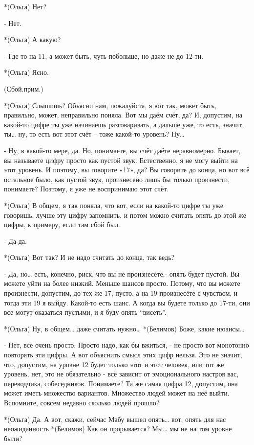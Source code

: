 *(Ольга) Нет?

- Нет.

*(Ольга) А какую?

- Где-то на 11, а может быть, чуть побольше, но даже не до 12-ти.

*(Ольга) Ясно.

(Сбой.прим.)

*(Ольга) Слышишь? Объясни нам, пожалуйста, я вот так, может быть, правильно, может, неправильно поняла. Вот мы даём счёт, да? И, допустим, на какой-то цифре ты уже начинаешь разговаривать, а дальше уже, то есть, значит, ты… ну, то есть вот этот счёт – тоже какой-то уровень? Ну…

- Ну, в какой-то мере, да. Но, понимаете, вы счёт даёте неравномерно. Бывает, вы называете цифру просто как пустой звук. Естественно, я не могу выйти на этот уровень. И поэтому, вы говорите «17», да? Вы говорите до конца, но вот всё остальное было, как пустой звук, произнесено лишь бы только произнести, понимаете? Поэтому, я уже не воспринимаю этот счёт.

*(Ольга) В общем, я так поняла, что вот, если на какой-то цифре ты уже говоришь, лучше эту цифру запомнить, и потом можно считать опять до этой же цифры, к примеру, если там сбой был.

- Да-да.

*(Ольга) Вот так? И не надо считать до конца, так ведь?

- Да, но… есть, конечно, риск, что вы не произнесёте,- опять будет пустой. Вы можете уйти на более низкий. Меньше шансов просто. Потому, что вы можете произнести, допустим, до тех же 17, пусто, а на 19 произнесёте с чувством, и тогда эти 19 я выйду. Какой-то есть шанс. А когда вы будете только до 17-ти, они все могут оказаться пустыми, и я буду опять “висеть”.

*(Ольга) Ну, в общем… даже считать нужно…
*(Белимов) Боже, какие нюансы…

- Нет, всё очень просто. Просто надо, как бы вжиться, - не просто вот монотонно повторять эти цифры. А вот объяснить смысл этих цифр нельзя. Это не значит, что, допустим, на уровне 12 будет только этот и этот человек, или тот же уровень, нет, это не обязательно - всё зависит от эмоционального настроя вас, переводчика, собеседников. Понимаете? Та же самая цифра 12, допустим, она может иметь множество вариантов. Множество людей может на неё выйти. Вспомните, совсем недавно сколько людей прошло?

*(Ольга) Да. А вот, скажи, сейчас Мабу вышел опять… вот, опять для нас неожиданность
*(Белимов) Как он прорывается? Мы… мы не на том уровне были?

